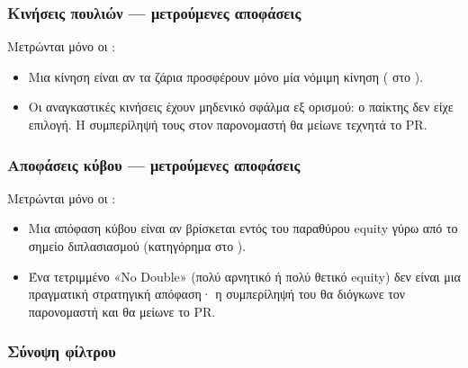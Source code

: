 \documentclass[letterpaper,10pt,greek]{sphinxmanual}
\begin{document}
\subsubsection{Κινήσεις πουλιών — μετρούμενες αποφάσεις}
\label{\detokenize{stats_parity:coups-de-pions-decisions-comptees}}
\sphinxAtStartPar
Μετρώνται μόνο οι :
\begin{itemize}
\item {} 
\sphinxAtStartPar
Μια κίνηση είναι  αν τα ζάρια προσφέρουν μόνο μία νόμιμη κίνηση ( στο ).

\item {} 
\sphinxAtStartPar
Οι αναγκαστικές κινήσεις έχουν μηδενικό σφάλμα εξ ορισμού: ο παίκτης δεν είχε επιλογή. Η συμπερίληψή τους στον παρονομαστή θα μείωνε τεχνητά το PR.

\end{itemize}


\subsubsection{Αποφάσεις κύβου — μετρούμενες αποφάσεις}
\label{\detokenize{stats_parity:decisions-de-cube-decisions-comptees}}
\sphinxAtStartPar
Μετρώνται μόνο οι :
\begin{itemize}
\item {} 
\sphinxAtStartPar
Μια απόφαση κύβου είναι  αν βρίσκεται εντός του παραθύρου equity \sphinxcode{\sphinxupquote{{[}\sphinxhyphen{}0.16, +0.16{]}}} γύρω από το σημείο διπλασιασμού (κατηγόρημα  στο ).

\item {} 
\sphinxAtStartPar
Ένα τετριμμένο «No Double» (πολύ αρνητικό ή πολύ θετικό equity) δεν είναι μια πραγματική στρατηγική απόφαση· η συμπερίληψή του θα διόγκωνε τον παρονομαστή και θα μείωνε το PR.

\end{itemize}


\subsubsection{Σύνοψη φίλτρου}
\label{\detokenize{stats_parity:resume-du-filtre}}
\end{document}
